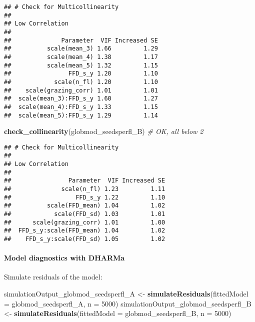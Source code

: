 \documentclass[
]{article}
\newenvironment{Shaded}{\begin{snugshade}}{\end{snugshade}}
\newcommand{\CommentTok}[1]{\textcolor[rgb]{0.56,0.35,0.01}{\textit{#1}}}
\newcommand{\DataTypeTok}[1]{\textcolor[rgb]{0.13,0.29,0.53}{#1}}
\newcommand{\DecValTok}[1]{\textcolor[rgb]{0.00,0.00,0.81}{#1}}
\newcommand{\KeywordTok}[1]{\textcolor[rgb]{0.13,0.29,0.53}{\textbf{#1}}}
\newcommand{\NormalTok}[1]{#1}
\newcommand{\StringTok}[1]{\textcolor[rgb]{0.31,0.60,0.02}{#1}}
\begin{document}
\begin{verbatim}
## # Check for Multicollinearity
## 
## Low Correlation
## 
##              Parameter  VIF Increased SE
##          scale(mean_3) 1.66         1.29
##          scale(mean_4) 1.38         1.17
##          scale(mean_5) 1.32         1.15
##                FFD_s_y 1.20         1.10
##            scale(n_fl) 1.20         1.10
##    scale(grazing_corr) 1.01         1.01
##  scale(mean_3):FFD_s_y 1.60         1.27
##  scale(mean_4):FFD_s_y 1.33         1.15
##  scale(mean_5):FFD_s_y 1.29         1.14
\end{verbatim}

\begin{Shaded}
\begin{Highlighting}[]
\KeywordTok{check_collinearity}\NormalTok{(globmod_seedsperfl_B) }\CommentTok{# OK, all below 2}
\end{Highlighting}
\end{Shaded}

\begin{verbatim}
## # Check for Multicollinearity
## 
## Low Correlation
## 
##                Parameter  VIF Increased SE
##              scale(n_fl) 1.23         1.11
##                  FFD_s_y 1.22         1.10
##          scale(FFD_mean) 1.04         1.02
##            scale(FFD_sd) 1.03         1.01
##      scale(grazing_corr) 1.01         1.00
##  FFD_s_y:scale(FFD_mean) 1.04         1.02
##    FFD_s_y:scale(FFD_sd) 1.05         1.02
\end{verbatim}

\hypertarget{model-diagnostics-with-dharma-2}{%
\paragraph{Model diagnostics with
DHARMa}\label{model-diagnostics-with-dharma-2}}

Simulate residuals of the model:

\begin{Shaded}
\begin{Highlighting}[]
\NormalTok{simulationOutput_globmod_seedsperfl_A <-}\StringTok{ }
\StringTok{  }\KeywordTok{simulateResiduals}\NormalTok{(}\DataTypeTok{fittedModel =}\NormalTok{ globmod_seedsperfl_A, }\DataTypeTok{n =} \DecValTok{5000}\NormalTok{)}
\NormalTok{simulationOutput_globmod_seedsperfl_B <-}\StringTok{ }
\StringTok{  }\KeywordTok{simulateResiduals}\NormalTok{(}\DataTypeTok{fittedModel =}\NormalTok{ globmod_seedsperfl_B, }\DataTypeTok{n =} \DecValTok{5000}\NormalTok{)}
\end{Highlighting}
\end{Shaded}
\end{document}
